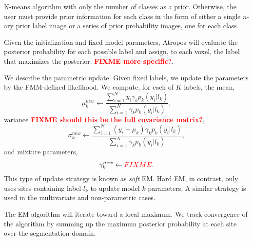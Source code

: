 \documentclass[11pt,english]{article}
\begin{document}
{\begin{description}
K-means algorithm with only the number of classes as a prior.
Otherwise, the user must provide prior information for each class in
the form of either a single $n$-ary prior label image or a series of
prior probability images, one for each class.
\item[E-Step: ICM Label Update:] Given the initialization and fixed
model parameters, Atropos will evaluate the posterior probability for
each possible label and assign, to each voxel, the label that
maximizes the posterior.  {\bf \textcolor{red}{ FIXME more specific?}}.
\item[M-Step: Parameter Update:] We describe the parametric update.  Given fixed labels, we update the
  parameters by the FMM-defined likelihood.  We compute, for each of
  $K$ labels, the mean,
$$ \mu^{new}_k \leftarrow \frac{ \sum_{i=1}^N  y_i \gamma_k p_k(y_i|l_k)}{ \sum_{i=1}^N \gamma_k p_k(y_i|l_k) },
$$
variance {\bf \textcolor{red}{ FIXME should this be the full
    covariance matrix?}},
$$ \sigma^{new}_k \leftarrow  \frac{ \sum_{i=1}^N  (y_i - \mu_k ) \gamma_k p_k(y_i|l_k)}{ \sum_{i=1}^N  \gamma_k p_k(y_i|l_k) },
$$
and mixture parameters, 
$$ \gamma^{new}_k \leftarrow  \textcolor{red}{ FIXME .}
$$
This type of update strategy is known as {\em soft} EM.  Hard EM, in
contrast, only uses sites containing label $l_k$ to update model $k$ parameters.
A similar strategy is used in the multivariate and non-parametric cases.
\end{description}
The EM algorithm will iterate toward a local maximum.  We track
convergence of the algorithm by summing up the maximum posterior
probability at each site over the segmentation domain.  
%
%
}
\end{document}
